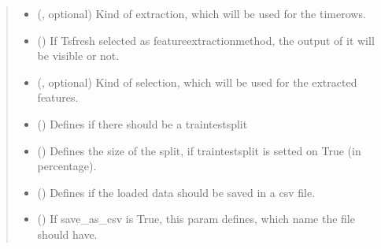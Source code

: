 \documentclass[letterpaper,10pt,english]{sphinxmanual}
\begin{document}
\begin{fulllineitems}
\begin{quote}
\begin{description}
\begin{itemize}
\item {} 
\sphinxAtStartPar
{} ({\hyperref[\detokenize{anoog.io:anoog.io.data_io.extraction_mode}]{}}, optional) \textendash{} Kind of extraction, which will be used for the timerows.

\item {} 
\sphinxAtStartPar
{} (\sphinxstyleliteralemphasis{\sphinxupquote{, }}) \textendash{} If Tsfresh selected as feature\sphinxhyphen{}extraction\sphinxhyphen{}method, the output of it will be visible or not.

\item {} 
\sphinxAtStartPar
{} ({\hyperref[\detokenize{anoog.io:anoog.io.data_io.selection_mode}]{}}, optional) \textendash{} Kind of selection, which will be used for the extracted features.

\item {} 
\sphinxAtStartPar
{} (\sphinxstyleliteralemphasis{\sphinxupquote{, }}) \textendash{} Defines if there should be a train\sphinxhyphen{}test\sphinxhyphen{}split

\item {} 
\sphinxAtStartPar
{} (\sphinxstyleliteralemphasis{\sphinxupquote{, }}) \textendash{} Defines the size of the split, if train\sphinxhyphen{}test\sphinxhyphen{}split is setted on True (in percentage).

\item {} 
\sphinxAtStartPar
{} (\sphinxstyleliteralemphasis{\sphinxupquote{, }}) \textendash{} Defines if the loaded data should be saved in a csv file.

\item {} 
\sphinxAtStartPar
{} (\sphinxstyleliteralemphasis{\sphinxupquote{, }}) \textendash{} If save\_as\_csv is True, this param defines, which name the file should have.


\end{itemize}
\end{description}
\end{quote}
\end{fulllineitems}
\end{document}
